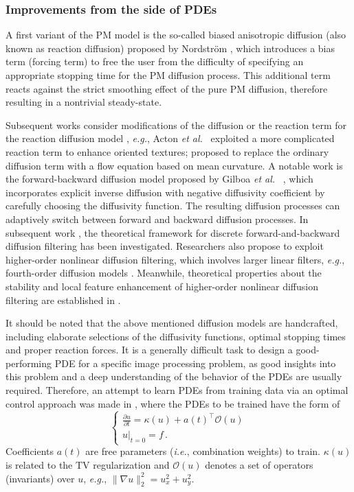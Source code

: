 \documentclass[10pt,journal,compsoc]{IEEEtran}
\newcommand{\etal}{\emph{et al.}}
\newcommand{\eg}{\emph{e.g.}}
\newcommand{\ie}{\emph{i.e.}}
\begin{document}
{\subsubsection{Improvements from the side of PDEs}\label{sec:pdes}
A first variant of the PM model is the so-called biased anisotropic diffusion 
(also known as reaction diffusion) proposed by Nordstr{\"o}m \cite{biased}, which introduces a bias term (forcing term) to 
free the user from the difficulty of specifying an appropriate stopping time for the PM diffusion process. 
This additional term reacts against the strict smoothing effect of the pure PM diffusion, therefore resulting in a nontrivial steady-state. 

Subsequent works consider modifications of the diffusion or the reaction 
term for the reaction diffusion model 
\cite{esclarin1997image, cottet1993image, acton2001oriented}, \eg, 
Acton \etal ~\cite{acton2001oriented} exploited 
a more complicated reaction term to enhance oriented 
textures; \cite{barcelos2003well} proposed 
to replace the ordinary diffusion term with a flow equation based on mean curvature. 
A notable work is the forward-backward diffusion model proposed by Gilboa \etal~ \cite{gilboa2002forward}, 
which incorporates explicit 
inverse diffusion with negative diffusivity coefficient by carefully choosing the diffusivity function. The resulting diffusion 
processes can adaptively switch between forward and backward diffusion processes. 
In subsequent work \cite{welk2009theoretical}, 
the theoretical framework for discrete forward-and-backward diffusion 
filtering has been investigated. 
Researchers also propose to exploit higher-order nonlinear diffusion filtering, which involves larger linear filters, 
\eg, fourth-order diffusion models \cite{hajiaboli2011anisotropic, didas2009properties, guidotti2011two}.
Meanwhile, theoretical properties about the stability and local feature enhancement of higher-order nonlinear diffusion filtering 
are established in \cite{didas2005stability}. 

It should be noted that the above mentioned diffusion models are 
handcrafted, including elaborate selections of the diffusivity functions, optimal stopping times and proper reaction forces. 
It is a generally difficult task to design a good-performing PDE for 
a specific image processing problem, as good insights into this problem and a deep understanding of the behavior of the PDEs are usually required. 
Therefore, an attempt to learn PDEs from training data via an 
optimal control approach was made in \cite{liu2010learning}, where 
the PDEs to be trained have the form of 
\begin{equation}\label{eq.liu}
\begin{cases}
\frac{\partial u}{\partial t} = \kappa(u) + a(t)^\top \mathcal{O}(u)\\
u \big|_{t = 0} = f \,.
\end{cases}
\end{equation} 
Coefficients $a(t)$ are free parameters (\ie, combination weights) 
to train. $\kappa(u)$ is related to the TV regularization 
\cite{rudin1992nonlinear} and $\mathcal{O}(u)$ denotes a set of 
operators (invariants) over $u$, \eg, $\|\nabla u\|_2^2 = u_x^2 + u_y^2$. 

}
\end{document}
